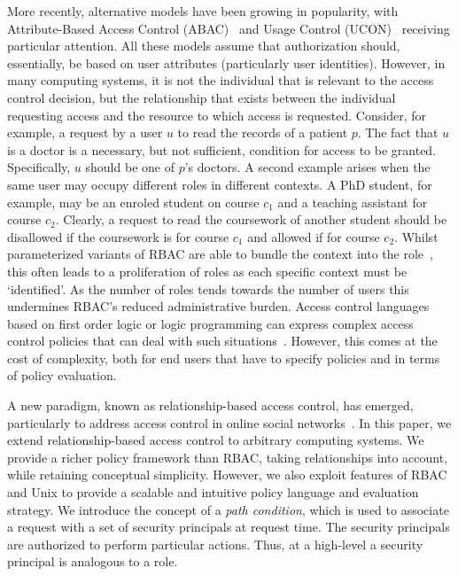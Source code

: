 \documentclass{article}
\begin{document}
More recently, alternative models have been growing in popularity, with Attribute-Based Access Control (ABAC)~\cite{Al-KahtaniS02} and Usage Control (UCON)~\cite{SandhuP03} receiving particular attention.
All these models assume that authorization should, essentially, be based on user attributes (particularly user identities).
However, in many computing systems, it is not the individual that is relevant to the access control decision, but the relationship that exists between the individual requesting access and the resource to which access is requested.
Consider, for example, a request by a user $u$ to read the records of a patient $p$.
The fact that $u$ is a doctor is a necessary, but not sufficient, condition for access to be granted.
Specifically, $u$ should be one of $p$'s doctors.
A second example arises when the same user may occupy different roles in different contexts.
A PhD student, for example, may be an enroled student on course $c_1$ and a teaching assistant for course $c_2$.
Clearly, a request to read the coursework of another student should be disallowed if the coursework is for course $c_1$ and allowed if for course $c_2$.
Whilst parameterized variants of RBAC are able to bundle the context into the role~\cite{GiuriI97}, this often leads to a proliferation of roles as each specific context must be `identified'.
As the number of roles tends towards the number of users this undermines RBAC's reduced administrative burden.
Access control languages based on first order logic or logic programming can express complex access control policies that can deal with such situations~\cite{BeckerFG10,GurevishN08}.
However, this comes at the cost of complexity, both for end users that have to specify policies and in terms of policy evaluation.

A new paradigm, known as relationship-based access control, has emerged, particularly to address access control in online social networks~\cite{CarminatiFP09,Fong11}.
In this paper, we extend relationship-based access control to arbitrary computing systems.
We provide a richer policy framework than RBAC, taking relationships into account, while retaining conceptual simplicity.
However, we also exploit features of RBAC and Unix to provide a scalable and intuitive policy language and evaluation strategy.
We introduce the concept of a \emph{path condition}, which is used to associate a request with a set of security principals at request time.
The security principals are authorized to perform particular actions.
Thus, at a high-level a security principal is analogous to a role.
\end{document}
